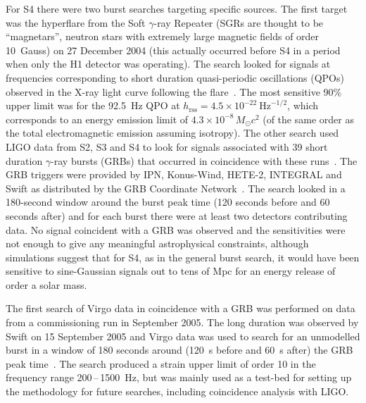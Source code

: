 \documentclass{article}
\begin{document}
For S4 there were two burst searches targeting specific sources. The first
target was the hyperflare from the Soft $\gamma$-ray Repeater 
(SGRs are thought to be ``magnetars'', neutron stars with extremely large
magnetic fields of order 10~Gauss) on 27 December 2004
\cite{Hurley:2005} (this actually occurred before S4 in a period when only the
H1 detector was operating). The search looked for signals at frequencies
corresponding to short duration quasi-periodic oscillations (QPOs) observed in
the X-ray light curve following the flare~\cite{Abbott:2007c}. The most
sensitive 90\% upper limit was for the 92.5~Hz QPO at $h_{\mathrm{rss}} =
4.5\times10^{-22} \mathrm{\ Hz}^{-1/2}$, which corresponds to an energy emission limit
of $4.3\times10^{-8}\,M_{\odot}c^2$ (of the same order as the total
electromagnetic emission assuming isotropy). The other search used LIGO data
from S2, S3 and S4 to look for signals associated with 39 short duration
$\gamma$-ray bursts (GRBs) that occurred in coincidence with these
runs~\cite{Abbott:2008c}. The GRB triggers were provided by IPN,
Konus-Wind, HETE-2, INTEGRAL and Swift as distributed by the GRB
Coordinate Network~\cite{GCN}. The search looked in a 180-second
window around the burst peak time (120 seconds before and 60 seconds
after) and for each burst there were at least two detectors
contributing data. No signal coincident with a GRB was observed and
the sensitivities were not enough to give any meaningful astrophysical
constraints, although simulations suggest that for S4, as in the general burst
search, it would have been sensitive to sine-Gaussian signals out to tens of Mpc
for an energy release of order a solar mass.

The first search of Virgo data in coincidence with a GRB was performed on data
from a commissioning run in September 2005. The long duration  was
observed by Swift on 15 September 2005 and Virgo data was used to search for an
unmodelled burst in a window of 180 seconds around (120~s before and 60~s after)
the GRB peak time~\cite{Acernese:2008a}. The search produced a strain upper
limit of order 10 in the frequency range 200\,--\,1500~Hz, but was mainly
used as a test-bed for setting up the methodology for future searches, including
coincidence analysis with LIGO.
\end{document}
